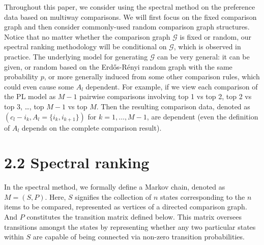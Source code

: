 Throughout this paper, we consider using the spectral method on the preference data based on multiway comparisons. We will first focus on the fixed comparison graph and then consider commonly-used random comparison graph structures. Notice that no matter whether the comparison graph \(\mathcal{G}\) is fixed or random, our spectral ranking methodology will be conditional on \(\mathcal{G}\), which is observed in practice. The underlying model for generating \(\mathcal{G}\) can be very general: it can be given, or random based on the Erdős-Rényi random graph with the same probability \(p\), or more generally induced from some other comparison rules, which could even cause some \(A_{l}\) dependent. For example, if we view each comparison of the PL model as \(M - 1\) pairwise comparisons involving top 1 vs top 2, top 2 vs top 3, \ldots, top \(M - 1\) vs top \(M\). Then the resulting comparison data, denoted as \((c_{l} - i_{k},A_{l} = \{i_{k},i_{k + 1}\})\) for \(k = 1,\ldots ,M - 1\), are dependent (even the definition of \(A_{l}\) depends on the complete comparison result).

\section{2.2 Spectral ranking}\label{spectral-ranking}

In the spectral method, we formally define a Markov chain, denoted as \(M = (S,P)\). Here, \(S\) signifies the collection of \(n\) states corresponding to the \(n\) items to be compared, represented as vertices of a directed comparison graph. And \(P\) constitutes the transition matrix defined below. This matrix oversees transitions amongst the states by representing whether any two particular states within \(S\) are capable of being connected via non-zero transition probabilities.

